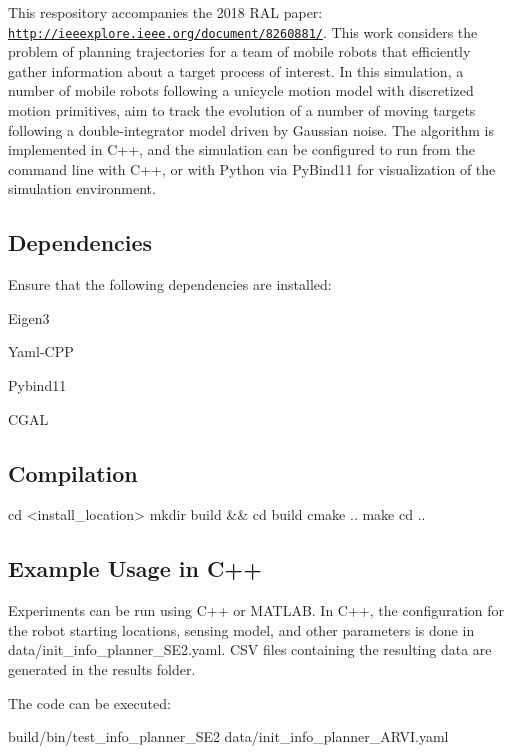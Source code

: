 This respository accompanies the 2018 R\+AL paper\+: \href{http://ieeexplore.ieee.org/document/8260881/}{\tt http\+://ieeexplore.\+ieee.\+org/document/8260881/}. This work considers the problem of planning trajectories for a team of mobile robots that efficiently gather information about a target process of interest. In this simulation, a number of mobile robots following a unicycle motion model with discretized motion primitives, aim to track the evolution of a number of moving targets following a double-\/integrator model driven by Gaussian noise. The algorithm is implemented in C++, and the simulation can be configured to run from the command line with C++, or with Python via Py\+Bind11 for visualization of the simulation environment.

\subsection*{Dependencies}

Ensure that the following dependencies are installed\+:


\begin{DoxyItemize}
\item Eigen3
\item Yaml-\/\+C\+PP
\item Pybind11
\item C\+G\+AL
\end{DoxyItemize}

\subsection*{Compilation}

\begin{DoxyVerb}cd <install_location>
mkdir build && cd build
cmake ..
make
cd ..
\end{DoxyVerb}


\subsection*{Example Usage in C++}

Experiments can be run using C++ or M\+A\+T\+L\+AB. In C++, the configuration for the robot starting locations, sensing model, and other parameters is done in data/init\+\_\+info\+\_\+planner\+\_\+\+S\+E2.\+yaml. C\+SV files containing the resulting data are generated in the results folder.

The code can be executed\+: \begin{DoxyVerb}build/bin/test_info_planner_SE2 data/init_info_planner_ARVI.yaml
\end{DoxyVerb}


